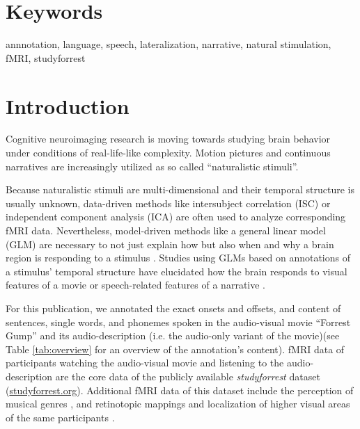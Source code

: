 \documentclass[10pt,a4paper,onecolumn]{article}
\begin{document}
\section*{Keywords}
annnotation, language, speech, lateralization, narrative, natural stimulation, fMRI, studyforrest

\listoftodos

\clearpage

\section*{Introduction}
Cognitive neuroimaging research is moving towards studying brain behavior
under conditions of real-life-like complexity. Motion pictures \citep{hasson2008neurocinematics} and continuous narratives \citep{honey2012not, lerner2011topographic} are increasingly utilized as so called ``naturalistic stimuli''.

Because naturalistic stimuli are multi-dimensional and their temporal structure
is usually unknown, data-driven methods like intersubject correlation (ISC)\citep{hasson2004intersubject} or independent component analysis
(ICA)\citep{bartels2004chronoarchitecture} are often used to analyze
corresponding fMRI data.
Nevertheless, model-driven methods like a general linear model (GLM) are necessary to not just explain how but also when and why a brain region is responding to a stimulus \citep{hamilton2018revolution}.
Studies using GLMs based on annotations of a stimulus' temporal structure have
elucidated how the brain responds to visual features of a movie
\citep{bartels2004mapping} or speech-related features of a narrative
\citep{rocca2019language}.

For this publication, we annotated the exact onsets and offsets, and content of sentences, single words, and phonemes spoken in the audio-visual movie ``Forrest Gump'' \citep{ForrestGumpMovie} and its audio-description (i.e. the audio-only variant of the movie)\citep{ForrestGumpDVD}(see Table \ref{tab:overview} for an overview of the annotation's content).
fMRI data of participants watching the audio-visual movie \citep{hanke2016simultaneous} and listening to the audio-description \citep{hanke2014audiomovie} are the core data of the publicly available \textit{studyforrest} dataset (\href{www.studyforrest.org}{studyforrest.org}).
Additional fMRI data of this dataset include the perception of musical genres \citep{hanke2015musical}, and retinotopic mappings and localization of higher visual areas of the same participants \citep{sengupta2016extension}.
\end{document}
